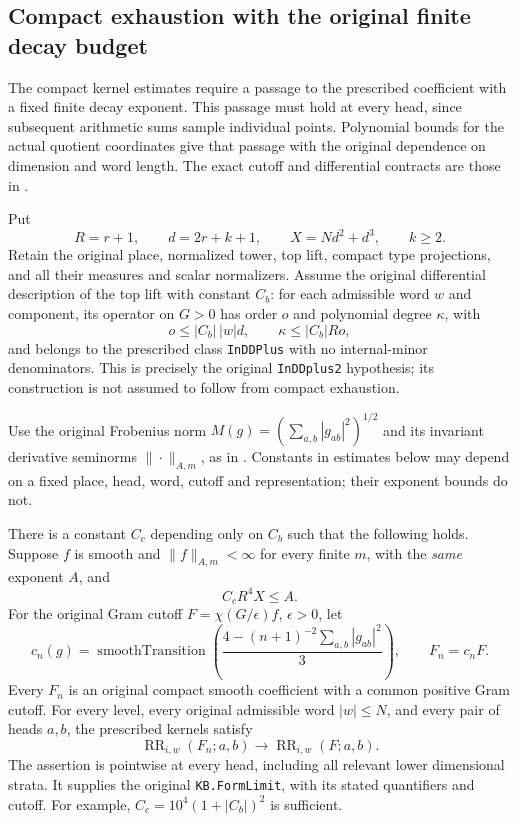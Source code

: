 \subsection{Compact exhaustion with the original finite decay budget}
\label{actual-finite-decay-exhaustion}

The compact kernel estimates require a passage to the prescribed
coefficient with a fixed finite decay exponent.  This passage must
hold at every head, since subsequent arithmetic sums sample individual
points.  Polynomial bounds for the actual quotient coordinates give
that passage with the original dependence on dimension and word length.
The exact cutoff and differential contracts are those in
\cite{finite-decay-source}.

Put
\[
 R=r+1,\qquad d=2r+k+1,\qquad
 X=Nd^2+d^3,\qquad k\ge2.
\]
Retain the original place, normalized tower, top lift, compact type
projections, and all their measures and scalar normalizers.  Assume
the original differential description of the top lift with constant
$C_b$: for each admissible word $w$ and component, its operator on
$G>0$ has order $o$ and polynomial degree $\kappa$, with
\begin{equation}\label{finite-decay-top-budget}
 o\le |C_b|\,|w|d,\qquad
 \kappa\le |C_b|Ro,
\end{equation}
and belongs to the prescribed class \texttt{InDDPlus} with no
internal-minor denominators.  This is precisely the original
\texttt{InDDplus2} hypothesis; its construction is not assumed to
follow from compact exhaustion.

Use the original Frobenius norm
$M(g)=(\sum_{a,b}|g_{ab}|^2)^{1/2}$ and its invariant derivative
seminorms $\|\cdot\|_{A,m}$, as in \JacquetUnfoldingReference.
Constants in estimates below may depend on a fixed place,
head, word, cutoff and representation; their exponent bounds do not.

\begin{theorem}\label{finite-decay-form-limit}
There is a constant $C_c$ depending only on $C_b$ such that the
following holds.  Suppose $f$ is smooth and
$\|f\|_{A,m}<\infty$ for every finite $m$, with the \emph{same}
exponent $A$, and
\[
                       C_cR^4X\le A.
\]
For the original Gram cutoff $F=\chi(G/\epsilon)f$, $\epsilon>0$,
let
\[
 c_n(g)=\operatorname{smoothTransition}
    \left(\frac{4-(n+1)^{-2}\sum_{a,b}|g_{ab}|^2}{3}\right),
       \qquad F_n=c_nF.
\]
Every $F_n$ is an original compact smooth coefficient with a common
positive Gram cutoff.  For every level, every original admissible
word $|w|\le N$, and every pair of heads $a,b$, the prescribed
kernels satisfy
\begin{equation}\label{finite-decay-kernel-limit}
                    \operatorname{RR}_{i,w}(F_n;a,b)
             \longrightarrow \operatorname{RR}_{i,w}(F;a,b).
\end{equation}
The assertion is pointwise at every head, including all relevant
lower dimensional strata.  It supplies the original
\texttt{KB.FormLimit}, with its stated quantifiers and cutoff.
For example, $C_c=10^4(1+|C_b|)^2$ is sufficient.
\end{theorem}


